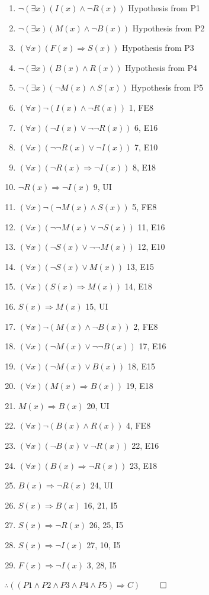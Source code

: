 \documentclass{article}
\begin{document}
			\begin{enumerate}
				\item $\lnot(\exists x)(I(x) \land \lnot R(x))$ \hfill Hypothesis from P1
				\item $\lnot(\exists x)(M(x) \land \lnot B(x))$ \hfill Hypothesis from P2
				\item $(\forall x)(F(x) \Rightarrow S(x))$ \hfill Hypothesis from P3
				\item $\lnot(\exists x)(B(x) \land R(x))$ \hfill Hypothesis from P4
				\item $\lnot(\exists x)(\lnot M(x) \land S(x))$ \hfill Hypothesis from P5
				\item $(\forall x)\lnot(I(x) \land \lnot R(x))$ \hfill 1, FE8
				\item $(\forall x)(\lnot I(x) \lor \lnot\lnot R(x))$ \hfill 6, E16
				\item $(\forall x)(\lnot\lnot R(x) \lor \lnot I(x))$ \hfill 7, E10
				\item $(\forall x)(\lnot R(x) \Rightarrow \lnot I(x))$ \hfill 8, E18
				\item $\lnot R(x) \Rightarrow \lnot I(x)$ \hfill 9, UI
				\item $(\forall x)\lnot(\lnot M(x) \land S(x))$ \hfill 5, FE8
				\item $(\forall x)(\lnot\lnot M(x) \lor \lnot S(x))$ \hfill 11, E16
				\item $(\forall x)(\lnot S(x) \lor \lnot\lnot M(x))$ \hfill 12, E10
				\item $(\forall x)(\lnot S(x) \lor M(x))$ \hfill 13, E15
				\item $(\forall x)(S(x) \Rightarrow M(x))$ \hfill 14, E18
				\item $S(x) \Rightarrow M(x)$ \hfill 15, UI
				\item $(\forall x)\lnot(M(x) \land \lnot B(x))$ \hfill 2, FE8
				\item $(\forall x)(\lnot M(x) \lor \lnot\lnot B(x))$ \hfill 17, E16
				\item $(\forall x)(\lnot M(x) \lor B(x))$ \hfill 18, E15
				\item $(\forall x)(M(x) \Rightarrow B(x))$ \hfill 19, E18
				\item $M(x) \Rightarrow B(x)$ \hfill 20, UI
				\item $(\forall x)\lnot(B(x) \land R(x))$ \hfill 4, FE8
				\item $(\forall x)(\lnot B(x) \lor \lnot R(x))$ \hfill 22, E16
				\item $(\forall x)(B(x) \Rightarrow \lnot R(x))$ \hfill 23, E18
				\item $B(x) \Rightarrow \lnot R(x)$ \hfill 24, UI
				\item $S(x) \Rightarrow B(x)$ \hfill 16, 21, I5
				\item $S(x) \Rightarrow \lnot R(x)$ \hfill 26, 25, I5
				\item $S(x) \Rightarrow \lnot I(x)$ \hfill 27, 10, I5
				\item $F(x) \Rightarrow \lnot I(x)$ \hfill 3, 28, I5
			\end{enumerate}
			$\therefore ((P1 \land P2 \land P3 \land P4 \land P5) \Rightarrow C)$ \hfill $\qed$ \\
\end{document}
